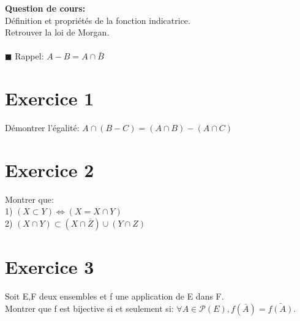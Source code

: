 \documentclass{article}
\begin{document}
\maketitle


\textbf{Question de cours:}
\\D\'efinition et propri\'et\'es de la fonction indicatrice.
\\Retrouver la loi de Morgan.
\\
\\$\blacksquare$ Rappel: $ A-B=A\cap {\bar{B}}$

\section{Exercice 1}
D\'emontrer l'\'egalit\'e: $A\cap (B-C)=(A\cap B)-(A\cap C) $

\section{Exercice 2}
Montrer que:
\\1) $(X\subset Y) \Leftrightarrow (X=X\cap Y)$
\\2) $(X\cap Y) \subset (X\cap \bar{Z}) \cup (Y\cap Z)$ 


\section{Exercice 3}
Soit E,F deux ensembles et f une application de E dans F.
\\Montrer que f est bijective si et seulement si: $ \forall{A} \in {\mathcal{P}(E)}, f(\bar{A})=\bar{f(A)}$.


\end{document}
